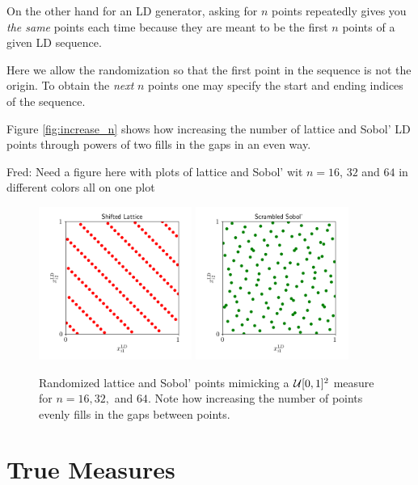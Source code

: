 \documentclass[graybox,footinfo]{svmult}
\newcommand{\FJHComment}[1]{{\color{magenta} Fred: #1}}
\begin{document}
On the other hand for an LD generator, asking for $n$ points repeatedly gives you \emph{the same} points each time because they are meant to be the first $n$ points of a given LD sequence.  

Here we allow the randomization so that the first point in the sequence is not the origin.  To obtain the \emph{next} $n$ points one may specify the start and ending indices of the sequence.


Figure \ref{fig:increase_n} shows how increasing the number of lattice and Sobol' LD points through powers of two fills in the gaps in an even way.

\FJHComment{Need a figure here with plots of lattice and Sobol' wit $n = 16$, $32$ and $64$ in different colors all on one plot}

\begin{figure}
	\includegraphics[height=5cm]{ags/figs/dd.lattice.png}
	\qquad
	\includegraphics[height=5cm]{ags/figs/dd.sobol.png}
	\caption{Randomized lattice and Sobol' points mimicking a ${\mathcal{U}}[0,1]^2$ measure for $n = 16, 32,$ and $64$. Note how increasing the number of points evenly fills in the gaps between points.}
	\label{fig:dd_iid}
\end{figure}

\section{True Measures}
\end{document}
